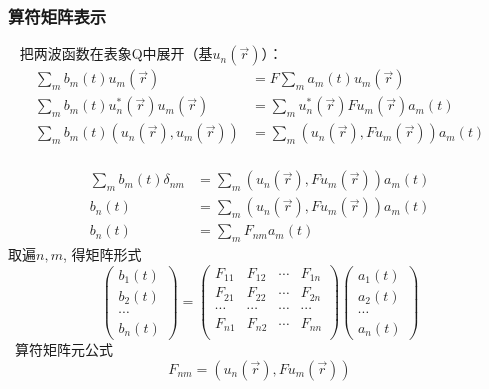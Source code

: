 \begin{frame}
    \frametitle{算符矩阵表示}    
    \解~ 把两波函数在表象Q中展开（基$u_n(\vec{r})$）：\\
    \begin{equation*}
        \begin{split} 
         \sum_m b_m(t)u_m(\vec{r})&= F\sum_m a_m(t)u_m(\vec{r}) \\
         \sum_m b_m(t)u_n ^*(\vec{r}) u_m(\vec{r})&= \sum_m u_n ^*(\vec{r}) Fu_m(\vec{r})a_m(t) \\
         \sum_m b_m(t)(u_n (\vec{r}), u_m(\vec{r}))&= \sum_m (u_n (\vec{r}), Fu_m(\vec{r}))a_m(t) \\
        \end{split}  
    \end{equation*} 
\end{frame}

\begin{frame} 
    \begin{equation*}
        \begin{split} 
         \sum_m b_m(t)\delta_{nm}&= \sum_m (u_n (\vec{r}), Fu_m(\vec{r}))a_m(t) \\
         b_n(t)&= \sum_m (u_n (\vec{r}), Fu_m(\vec{r}))a_m(t) \\
         b_n(t)&= \sum_m F_{nm} a_m(t) 
        \end{split}  
    \end{equation*} 
    取遍$n, m$, 得矩阵形式
    $$\begin{pmatrix}
        b_1(t)\\
        b_2(t)\\
        \cdots \\
        b_n(t)
    \end{pmatrix}
    =
    \begin{pmatrix}
       F_{11} & F_{12} & \cdots & F_{1n} \\
       F_{21} & F_{22} & \cdots & F_{2n} \\
       \cdots & \cdots &  \cdots& \cdots\\
        F_{n1} & F_{n2} & \cdots & F_{nn} \\
    \end{pmatrix}
    \begin{pmatrix}
        a_1(t)\\
        a_2(t)\\
        \cdots \\
        a_n(t)
    \end{pmatrix}
    $$
    \Tips~算符矩阵元公式 $$ F_{nm}=(u_n (\vec{r}), Fu_m(\vec{r})) $$
\end{frame} 
